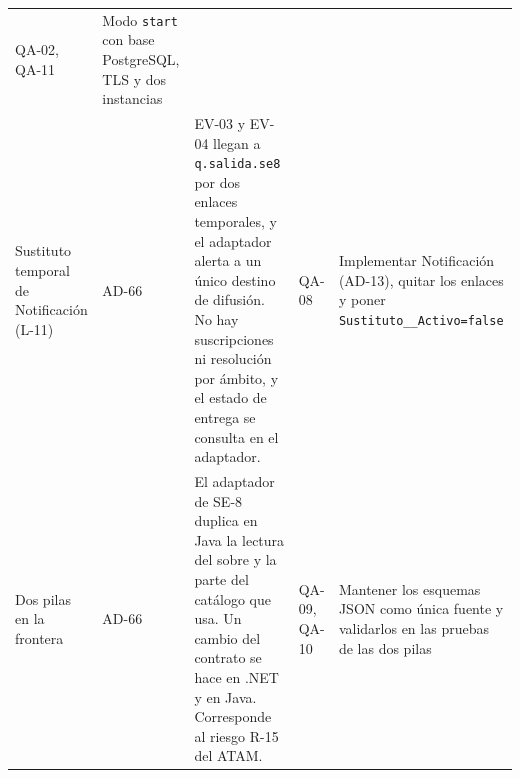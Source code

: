 \begin{longtable}{L{2.6cm} L{1.3cm} L{6.4cm} L{1.7cm} L{3.3cm}}
QA-02, QA-11 & Modo \texttt{start} con base PostgreSQL, TLS y dos instancias \\
Sustituto temporal de Notificación (L-11) & AD-66 &
EV-03 y EV-04 llegan a \texttt{q.salida.se8} por dos enlaces temporales, y el adaptador alerta a un único destino de difusión. No hay suscripciones ni resolución por ámbito, y el estado de entrega se consulta en el adaptador. &
QA-08 & Implementar Notificación (AD-13), quitar los enlaces y poner \texttt{Sustituto\_\_\br{}Activo=false} \\
Dos pilas en la frontera & AD-66 &
El adaptador de SE-8 duplica en Java la lectura del sobre y la parte del catálogo que usa. Un cambio del contrato se hace en .NET y en Java. Corresponde al riesgo R-15 del ATAM. &
QA-09, QA-10 & Mantener los esquemas JSON como única fuente y validarlos en las pruebas de las dos pilas \\
\end{longtable}
\endgroup
